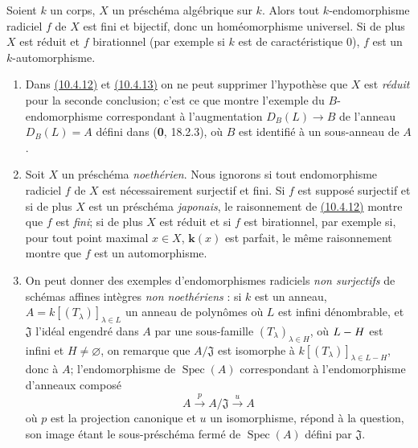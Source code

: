 \begin{corollary}[10.4.13]
Soient $k$ un corps, $X$ un préschéma algébrique sur $k$. Alors tout
$k$-endomorphisme radiciel $f$ de $X$ est fini et bijectif, donc un
homéomorphisme universel. Si de plus $X$ est réduit et $f$ birationnel
\textup{(par exemple si $k$ est de caractéristique 0)}, $f$ est un
$k$-automorphisme.
\end{corollary}

\begin{remarks}[10.4.14]
\label{IV.10.4.14}
\begin{enumerate}[label=\textup{(\roman*)}]
\item Dans {\hyperlink{ega4.c04.cor.10-4-12}{(10.4.12)}} et
{\hyperlink{ega4.c04.cor.10-4-13}{(10.4.13)}} on ne peut supprimer
l'hypothèse que $X$ est \emph{réduit} pour la seconde conclusion; c'est ce que
montre l'exemple du $B$-endomorphisme correspondant à l'augmentation
$D_B(L)\to B$ de l'anneau $D_B(L)=A$ défini dans (\textbf{0}, 18.2.3), où
$B$ est identifié à un sous-anneau de $A$.

\item Soit $X$ un préschéma \emph{noethérien}. Nous ignorons si tout
endomorphisme radiciel $f$ de $X$ est nécessairement surjectif et fini.
Si $f$ est supposé surjectif et si de plus $X$ est un préschéma
\emph{japonais}, le raisonnement de
{\hyperlink{ega4.c04.cor.10-4-12}{(10.4.12)}} montre que $f$ est \emph{fini};
si de plus $X$ est réduit et si $f$ est birationnel, par exemple si,
pour tout point maximal $x\in X$, $\boldsymbol{k}(x)$ est parfait, le même
raisonnement montre que $f$ est un automorphisme.

\item On peut donner des exemples d'endomorphismes radiciels \emph{non
surjectifs} de schémas affines intègres \emph{non noethériens} : si $k$ est un
anneau, $A=k[(T_\lambda)]_{\lambda\in L}$ un anneau de polynômes où $L$
est infini dénombrable, et $\mathfrak J$ l'idéal engendré dans $A$ par
une sous-famille $(T_\lambda)_{\lambda\in H}$, où $L- H$ est infini et
$H\neq\varnothing$, on remarque que $A/\mathfrak J$ est isomorphe à
$k[(T_\lambda)]_{\lambda\in L-H}$, donc à $A$; l'endomorphisme de
$\operatorname{Spec}(A)$ correspondant à l'endomorphisme d'anneaux
composé
\[
 A\xrightarrow{p}A/\mathfrak J\xrightarrow{u}A
\]
où $p$ est la projection canonique et $u$ un isomorphisme, répond à la
question, son image étant le sous-préschéma fermé de
$\operatorname{Spec}(A)$ défini par $\mathfrak J$.
\end{enumerate}
\end{remarks}


